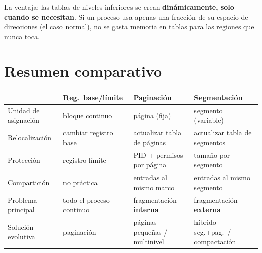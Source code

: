 \documentclass[11pt,letterpaper]{article}
\begin{document}
\begin{center}
\end{center}

\begin{idea}
La ventaja: las tablas de niveles inferiores se crean \textbf{din\'amicamente, solo cuando se necesitan}. Si un proceso usa apenas una fracci\'on de su espacio de direcciones (el caso normal), no se gasta memoria en tablas para las regiones que nunca toca.
\end{idea}

\section*{Resumen comparativo}

\begin{center}
\small
\begin{tabular}{p{3.1cm}p{3.3cm}p{3.3cm}p{4.2cm}}
\toprule
 & \textbf{Reg.\ base/l\'imite} & \textbf{Paginaci\'on} & \textbf{Segmentaci\'on} \\
\midrule
Unidad de asignaci\'on & bloque continuo & p\'agina (fija) & segmento (variable) \\
Relocalizaci\'on & cambiar registro base & actualizar tabla de p\'aginas & actualizar tabla de segmentos \\
Protecci\'on & registro l\'imite & PID + permisos por p\'agina & tama\~no por segmento \\
Compartici\'on & no pr\'actica & entradas al mismo marco & entradas al mismo segmento \\
Problema principal & todo el proceso continuo & fragmentaci\'on \textbf{interna} & fragmentaci\'on \textbf{externa} \\
Soluci\'on evolutiva & paginaci\'on & p\'aginas peque\~nas / multinivel & h\'ibrido seg.+pag.\ / compactaci\'on \\
\bottomrule
\end{tabular}
\end{center}
\end{document}
